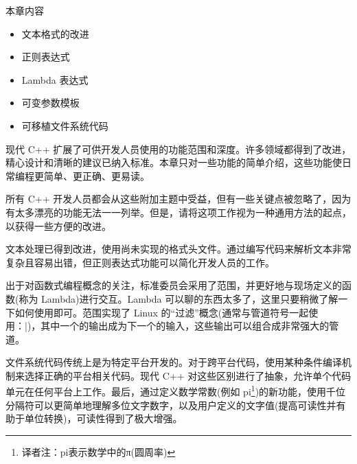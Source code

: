 本章内容

\begin{itemize}
\item
文本格式的改进

\item
正则表达式

\item
Lambda 表达式

\item
可变参数模板

\item
可移植文件系统代码
\end{itemize}

现代 C++ 扩展了可供开发人员使用的功能范围和深度。许多领域都得到了改进，精心设计和清晰的建议已纳入标准。本章只对一些功能的简单介绍，这些功能使日常编程更简单、更正确、更易读。

所有 C++ 开发人员都会从这些附加主题中受益，但有一些关键点被忽略了，因为有太多漂亮的功能无法一一列举。但是，请将这项工作视为一种通用方法的起点，以获得一些方便的改进。

文本处理已得到改进，使用尚未实现的格式头文件。通过编写代码来解析文本非常复杂且容易出错，但正则表达式功能可以简化开发人员的工作。

出于对函数式编程概念的关注，标准委员会采用了范围，并更好地与现场定义的函数(称为 Lambda)进行交互。Lambda 可以聊的东西太多了，这里只要稍微了解一下如何使用即可。范围实现了 Linux 的“过滤”概念(通常与管道符号一起使用：|)，其中一个的输出成为下一个的输入，这些输出可以组合成非常强大的管道。

文件系统代码传统上是为特定平台开发的。对于跨平台代码，使用某种条件编译机制来选择正确的平台相关代码。现代 C++ 对这些区别进行了抽象，允许单个代码单元在任何平台上工作。最后，通过定义数学常数(例如 pi\footnote{译者注：pi表示数学中的π(圆周率)})的新功能，使用千位分隔符可以更简单地理解多位文字数字，以及用户定义的文字值(提高可读性并有助于单位转换)，可读性得到了极大增强。











